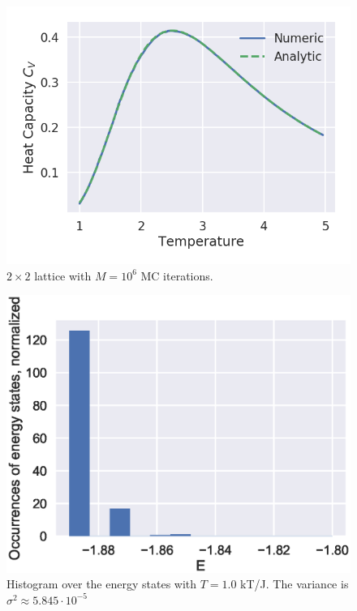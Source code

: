 \documentclass[aps,reprint]{revtex4-1}
\begin{document}
\begin{figure}[H]
  \centering
  \includegraphics[width=\columnwidth]{figures/L2Ne6.png}
  \caption{$2 \times 2$ lattice with $M = 10^6$ MC iterations.}
  \label{fig:L2Ne6}
\end{figure}
\begin{figure}[H]
  \centering
  \includegraphics[width=\columnwidth]{figures/4da.eps}
  \caption{\label{fig:4da} Histogram over the energy states with \(T=1.0\) kT/J.
  The variance is \(\sigma^{2} \approx 5.845\cdot 10^{-5}\)}
\end{figure}
\end{document}
